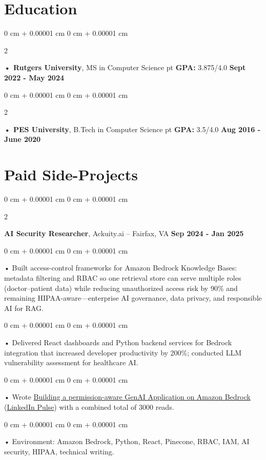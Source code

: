 \documentclass[10pt, letterpaper]{article}
\newenvironment{onecolentry}{
    \begin{adjustwidth}{
        0 cm + 0.00001 cm
    }{
        0 cm + 0.00001 cm
    }
}{
    \end{adjustwidth}
} %
\newenvironment{twocolentry}[2][]{
    \onecolentry
    \def\secondColumn{#2}
    \setcolumnwidth{\fill, 4.5 cm}
    \begin{paracol}{2}
}{
    \switchcolumn \raggedleft \secondColumn
    \end{paracol}
    \endonecolentry
} %
\begin{document}
        \section{Education}
        \vspace{2 pt }
        \begin{twocolentry}{
            \textbf{Sept 2022 - May 2024}
        }
            \textbf{ • Rutgers University}, MS in Computer Science  pt \textbf{GPA:} 3.875/4.0  \end{twocolentry}

        \begin{twocolentry}{
            \textbf{Aug 2016 - June 2020}
        }
            \textbf{ • PES University}, B.Tech in Computer Science  pt \textbf{GPA:} 3.5/4.0  \end{twocolentry}

                        \vspace{0.4cm}
    \section{Paid Side-Projects}
            \vspace{2 pt }
                    \begin{twocolentry}{
            \textbf{Sep 2024 - Jan 2025}
        }
            \textbf{AI Security Researcher}, Ackuity.ai -- Fairfax, VA\end{twocolentry}

        \begin{onecolentry}
             • Built access-control frameworks for Amazon Bedrock Knowledge Bases: metadata filtering and RBAC so one retrieval store can serve multiple roles (doctor--patient data) while reducing unauthorized access risk by 90\% and remaining HIPAA-aware---enterprise AI governance, data privacy, and responsible AI for RAG.
        \end{onecolentry}
        \begin{onecolentry}
             • Delivered React dashboards and Python backend services for Bedrock integration that increased developer productivity by 200\%; conducted LLM vulnerability assessment for healthcare AI.
        \end{onecolentry}
        \begin{onecolentry}
             • Wrote \href{https://medium.com/@sreenikethaathreya/building-a-permission-aware-genai-application-on-amazon-bedrock-8fdc2410dd43}{Building a permission-aware GenAI Application on Amazon Bedrock} (\href{https://www.linkedin.com/pulse/building-permission-aware-genai-application-amazon-bedrock-aathreya-g7nme/}{LinkedIn Pulse}) with a combined total of 3000 reads.
        \end{onecolentry}
        \begin{onecolentry}
             • Environment: Amazon Bedrock, Python, React, Pinecone, RBAC, IAM, AI security, HIPAA, technical writing.

        \end{onecolentry}
             \vspace{2 pt }
\end{document}
